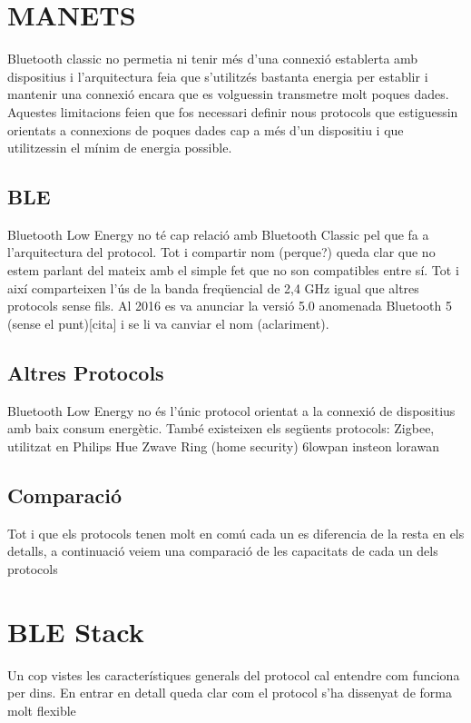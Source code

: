 \section{MANETS}
Bluetooth classic no permetia ni tenir més d'una connexió establerta amb dispositius i l'arquitectura feia que s'utilitzés bastanta energia per establir i mantenir una connexió encara que es volguessin transmetre molt poques dades.
Aquestes limitacions feien que fos necessari definir nous protocols que estiguessin orientats a connexions de poques dades cap a més d'un dispositiu i que utilitzessin el mínim de energia possible.

\subsection{BLE}
Bluetooth Low Energy no té cap relació amb Bluetooth Classic pel que fa a l'arquitectura del protocol. Tot i compartir nom (perque?) queda clar que no estem parlant del mateix amb el simple fet que no son compatibles entre sí. Tot i així comparteixen l'ús de la banda freqüencial de 2,4 GHz igual que altres protocols sense fils. Al 2016 es va anunciar la versió 5.0 anomenada Bluetooth 5 (sense el punt)[cita] i se li va canviar el nom (aclariment).


\subsection{Altres Protocols}
Bluetooth Low Energy no és l'únic protocol orientat a la connexió de dispositius amb baix consum energètic. També existeixen els següents protocols:
Zigbee, utilitzat en Philips Hue
Zwave Ring (home security)
6lowpan
insteon
lorawan


\subsection{Comparació}
Tot i que els protocols tenen molt en comú cada un es diferencia de la resta en els detalls, a continuació veiem una comparació de les capacitats de cada un dels protocols

\section{BLE Stack}
Un cop vistes les característiques generals del protocol cal entendre com funciona per dins.
En entrar en detall queda clar com el protocol s'ha dissenyat de forma molt flexible 

